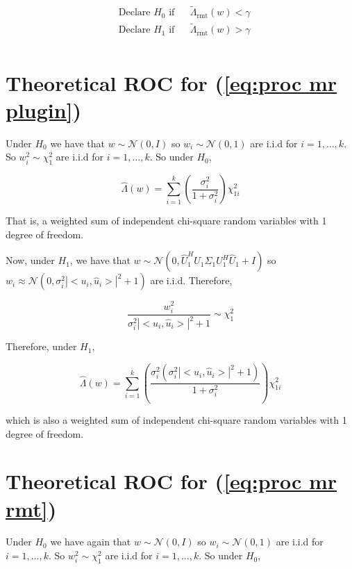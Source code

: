 \documentclass[english]{article}
\begin{document}
\begin{equation}
\begin{aligned}
&\text{Declare } H_0 \text{ if}
&& \tilde{\Lambda}_{\text{rmt}}(w) < \gamma\\
& \text{Declare } H_1 \text{ if}
&& \tilde{\Lambda}_{\text{rmt}}(w) > \gamma\\
\end{aligned}
\end{equation}

\section*{Theoretical ROC for (\ref{eq:proc mr plugin})}

Under $H_0$ we have that $w\sim\mathcal{N}(0,I)$ so $w_i\sim\mathcal{N}(0,1)$ are i.i.d for $i=1,\dots,k$. So $w_i^2\sim\chi_1^2$ are i.i.d for $i=1,\dots,k$. So under $H_0$,

\begin{equation}
\hat{\Lambda}(w)=\sum_{i=1}^k\left(\frac{\sigma_i^2}{1+\sigma_i^2}\right)\chi^2_{1i}
\end{equation}

That is, a weighted sum of independent chi-square random variables with 1 degree of freedom.

Now, under $H_1$, we have that $w\sim\mathcal{N}(0,\hat{U}^H_1U_1\Sigma_1U_1^H\hat{U}_1+I)$ so $w_i\approx\mathcal{N}(0,\sigma^2_i|<u_i,\hat{u}_i>|^2+1)$ are i.i.d.  Therefore,

\begin{equation}
\frac{w_i^2}{\sigma^2_i|<u_i,\hat{u}_i>|^2+1}\sim\chi_1^2
\end{equation}

Therefore, under $H_1$,

\begin{equation}
\hat{\Lambda}(w)=\sum_{i=1}^k\left(\frac{\sigma_i^2\left(\sigma^2_i|<u_i,\hat{u}_i>|^2+1\right)}{1+\sigma_i^2}\right)\chi^2_{1i}
\end{equation}

which is also a weighted sum of independent chi-square random variables with 1 degree of freedom.

\section*{Theoretical ROC for (\ref{eq:proc mr rmt})}

Under $H_0$ we have again that $w\sim\mathcal{N}(0,I)$ so $w_i\sim\mathcal{N}(0,1)$ are i.i.d for $i=1,\dots,k$. So $w_i^2\sim\chi_1^2$ are i.i.d for $i=1,\dots,k$. So under $H_0$,
\end{document}
